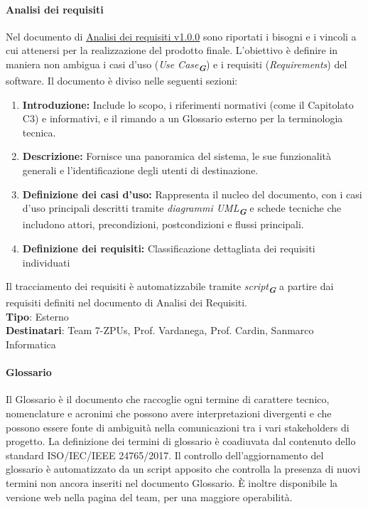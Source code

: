 \documentclass[a4paper,12pt]{article}
\newcommand{\glossario}[1]{\textit{#1}\textsubscript{\textbf{\textit{\textcolor{lightblack}{G}}}}}
\begin{document}
\paragraph{Analisi dei requisiti}\label{analisiDeiRequisiti}
Nel documento di \href{https://7-zpus.github.io/Docs/assets/pdf/AnalisiDeiRequisiti.pdf}{\ul{Analisi dei requisiti v1.0.0}}  sono riportati i bisogni e i vincoli a cui attenersi per la realizzazione del prodotto finale. L'obiettivo è definire in maniera non ambigua i casi d'uso (\glossario{\textit{Use Case}}) e i requisiti (\textit{Requirements}) del software. Il documento è diviso nelle seguenti sezioni:
\begin{enumerate}
    \item \textbf{Introduzione:} Include lo scopo, i riferimenti normativi (come il Capitolato C3) e informativi, e il rimando a un Glossario esterno per la terminologia tecnica.
    \item \textbf{Descrizione:} Fornisce una panoramica del sistema, le sue funzionalità generali e l'identificazione degli utenti di destinazione.
    \item \textbf{Definizione dei casi d'uso:} Rappresenta il nucleo del documento, con i casi d'uso principali descritti tramite \glossario{diagrammi UML} e schede tecniche che includono attori, precondizioni, postcondizioni e flussi principali.
    \item \textbf{Definizione dei requisiti:} Classificazione dettagliata dei requisiti individuati
\end{enumerate}
Il tracciamento dei requisiti è automatizzabile tramite \glossario{script} a partire dai requisiti definiti nel documento di Analisi dei Requisiti. \\
\textbf{Tipo}: Esterno \\
\textbf{Destinatari}: Team 7-ZPUs, Prof. Vardanega, Prof. Cardin, Sanmarco Informatica \\

\paragraph{Glossario}
Il Glossario è il documento che raccoglie ogni termine di carattere tecnico,
nomenclature e acronimi che possono avere interpretazioni divergenti e che possono essere fonte di ambiguità
nella comunicazioni tra i vari stakeholders di progetto. La definizione dei
termini di glossario è coadiuvata dal contenuto dello standard ISO/IEC/IEEE
24765/2017.
Il controllo dell'aggiornamento del glossario è automatizzato da un script apposito che controlla la presenza di nuovi termini non ancora inseriti nel documento Glossario.
È inoltre disponibile la versione web nella pagina del team, per una maggiore operabilità.
\end{document}
